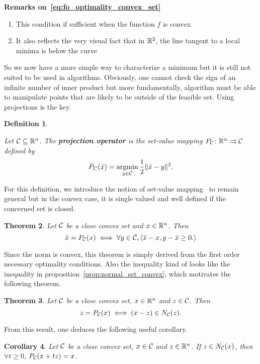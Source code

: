 \documentclass[10pt]{article}
\newtheorem{theorem}{Theorem}[]
\newtheorem{definition}[theorem]{Definition}
\newtheorem{corollary}[theorem]{Corollary}
\numberwithin{equation}{section}
\begin{document}
	\textbf{Remarks on~\eqref{eq:fo_optimality_convex_set}}
	\begin{enumerate}
		\item This condition if sufficient when the function $f$ is convex
		\item It also reflects the very visual fact that in ${\mathbb{R}}^2$, the line tangent to a local minima is below the curve
	\end{enumerate}
	
	So we now have a more simple way to characterize a minimum but it is still not suited to be used in algorithms. Obviously, one cannot check the sign of an infinite number of inner product but more fundamentally, algorithm must be able to manipulate points that are likely to be outside of the feasible set. Using projections is the key.
	
	\begin{definition}\label{def:projection}
		
		Let ${\mathcal{C}} \subseteq {\mathbb{R}}^n$. The \textbf{projection operator} is the set-value mapping $P_{\mathcal{C}} \colon {\mathbb{R}}^n \rightrightarrows {\mathcal{C}} $ defined by
		\[ P_C(\bar{x}) = \operatorname*{argmin}_{y \in {\mathcal{C}}}  \dfrac{1}{2} \|\bar{x}-y\|^2.\]
	\end{definition}
	
	For this definition, we introduce the notion of set-value mapping~\cite{rockafellarwets:1998} to remain general but in the convex case, it is single valued and well defined if the concerned set is closed. 
	
	\begin{theorem}
		Let ${\mathcal{C}}$ be a close convex set and $x \in {\mathbb{R}}^n$. Then
		\[\bar{x} = P_{\mathcal{C}}(x) \iff \forall y \in {\mathcal{C}}, \left\langle {\bar{x}-x} , {y-\bar{x} \ge 0.} \right\rangle\]
	\end{theorem}
	
	Since the norm is convex, this theorem is simply derived from the first order necessary optimality  conditions. Also the inequality kind of looks like the inequality in proposition~\eqref{prop:normal_set_convex}, which motivates the following theorem.
	
	\begin{theorem}
		Let ${\mathcal{C}}$ be a close convex set, $x \in {\mathbb{R}}^n$ and $z \in {\mathcal{C}}$. Then
		\[z = P_{\mathcal{C}}(x) \iff (x-z) \in N_{\mathcal{C}}(z).\]
	\end{theorem}
	
	From this result, one deduces the following useful corollary.
	
	\begin{corollary}
		Let ${\mathcal{C}}$ be a close convex set, $x \in {\mathcal{C}}$ and $z \in {\mathbb{R}}^n$. If $z \in N_{\mathcal{C}}(x)$, then $\forall t\ge 0$, $P_{\mathcal{C}}(x+tz)=x$.
	\end{corollary}
	
\end{document}

